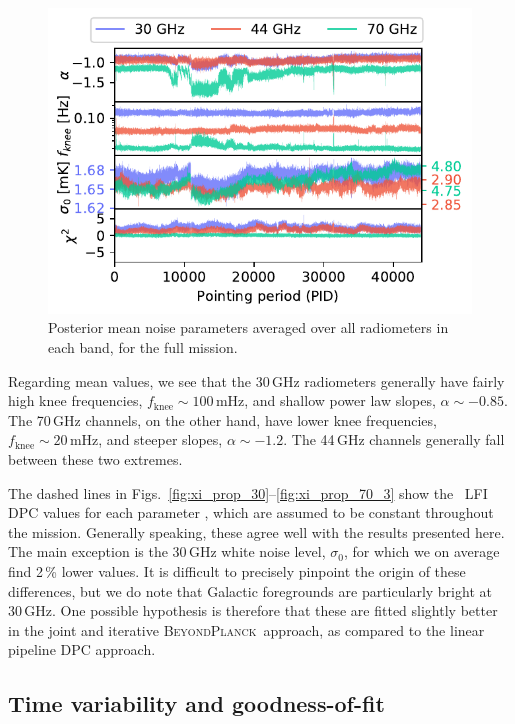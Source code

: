 \documentclass[twocolumn]{aa}
\newcommand{\BP}{\textsc{BeyondPlanck}}
\begin{document}
\begin{figure}
	\begin{center}
		\includegraphics[width=1.04\linewidth]{figs/xi_vs_pid_mean.pdf}
	\end{center}
	\caption{Posterior mean noise parameters averaged over all radiometers in each band, for the full mission.
		\label{fig:xi_vs_pid_mean}}
\end{figure}

Regarding mean values, we see that the 30\,GHz radiometers generally
have fairly high knee frequencies,
$f_\mathrm{knee}\sim100\,\textrm{mHz}$, and shallow power law slopes,
$\alpha\sim-0.85$. The 70\,GHz channels, on the other hand, have lower
knee frequencies, $f_\mathrm{knee}\sim20\,\textrm{mHz}$, and steeper
slopes, $\alpha\sim-1.2$. The 44\,GHz channels generally
fall between these two extremes. 

The dashed lines in Figs.~\ref{fig:xi_prop_30}--\ref{fig:xi_prop_70_3}
show the \Planck\ LFI DPC values for each parameter
\citep{planck2016-l02}, which are assumed to be constant throughout
the mission. Generally speaking, these agree well with the results
presented here. The main exception is the 30\,GHz white noise level,
$\sigma_0$, for which we on average find 2\,\% lower values. It is
difficult to precisely pinpoint the origin of these differences, but
we do note that Galactic foregrounds are particularly bright at
30\,GHz. One possible hypothesis is therefore that these are fitted
slightly better in the joint and iterative \BP\ approach, as compared
to the linear pipeline DPC approach.

\subsection{Time variability and goodness-of-fit}
\end{document}
